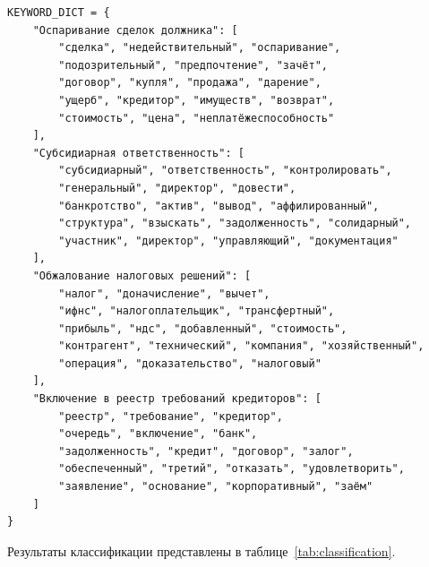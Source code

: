 \documentclass[12pt, a4paper]{report}
\begin{document}
\begin{lstlisting}[caption={Расширенный словарь ключевых лемм}, label={lst:keywords}]
KEYWORD_DICT = {
    "Оспаривание сделок должника": [
        "сделка", "недействительный", "оспаривание",
        "подозрительный", "предпочтение", "зачёт",
        "договор", "купля", "продажа", "дарение",
        "ущерб", "кредитор", "имуществ", "возврат",
        "стоимость", "цена", "неплатёжеспособность"
    ],
    "Субсидиарная ответственность": [
        "субсидиарный", "ответственность", "контролировать",
        "генеральный", "директор", "довести",
        "банкротство", "актив", "вывод", "аффилированный",
        "структура", "взыскать", "задолженность", "солидарный",
        "участник", "директор", "управляющий", "документация"
    ],
    "Обжалование налоговых решений": [
        "налог", "доначисление", "вычет",
        "ифнс", "налогоплательщик", "трансфертный",
        "прибыль", "ндс", "добавленный", "стоимость",
        "контрагент", "технический", "компания", "хозяйственный",
        "операция", "доказательство", "налоговый"
    ],
    "Включение в реестр требований кредиторов": [
        "реестр", "требование", "кредитор",
        "очередь", "включение", "банк",
        "задолженность", "кредит", "договор", "залог",
        "обеспеченный", "третий", "отказать", "удовлетворить",
        "заявление", "основание", "корпоративный", "заём"
    ]
}
\end{lstlisting}

Результаты классификации представлены в таблице~\ref{tab:classification}.
\end{document}
